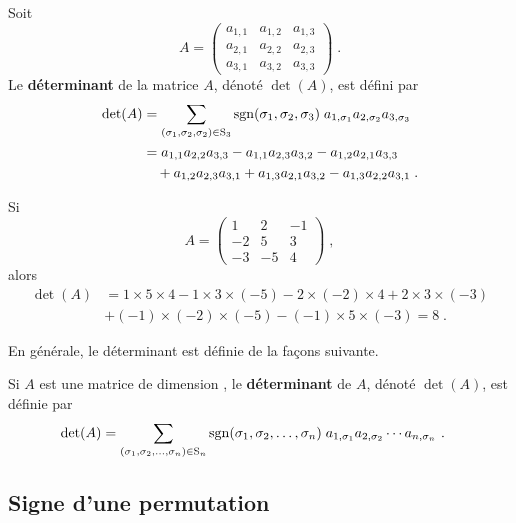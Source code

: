 {\begin{defn} 
Soit
\[
A = \begin{pmatrix} a_{1,1} & a_{1,2} & a_{1,3} \\
a_{2,1} & a_{2,2} & a_{2,3} \\
a_{3,1} & a_{3,2} & a_{3,3}
\end{pmatrix} \; .
\]
Le {\bfseries déterminant} de la matrice $A$, dénoté $\det(A)$, est
défini par
\begin{align*}
\det(A) &= \sum_{(\sigma_1,\sigma_2,\sigma_2)\in \mathrm{S}_{3}} \operatorname{sgn}
(\sigma_1,\sigma_2,\sigma_3)\; a_{1,\sigma_1} a_{2,\sigma_2} a_{3,\sigma_3} \\
&= a_{1,1}a_{2,2}a_{3,3} - a_{1,1}a_{2,3}a_{3,2}
- a_{1,2}a_{2,1}a_{3,3} \\
&\quad + a_{1,2}a_{2,3}a_{3,1}
+ a_{1,3}a_{2,1}a_{3,2} - a_{1,3}a_{2,2}a_{3,1} \; .
\end{align*}
\end{defn}

\begin{egg}
Si
\[
A= \begin{pmatrix} 1 & 2 & -1 \\ -2 & 5 & 3 \\
-3 & -5 & 4 \end{pmatrix} \; ,
\]
alors
\begin{align*}
\det(A) &= 1\times 5 \times 4 - 1\times 3 \times (-5)
- 2 \times (-2)\times 4 + 2 \times 3 \times (-3) \\
& +(-1)\times (-2)\times (-5) - (-1)\times 5 \times (-3)
= 8 \; .
\end{align*}
\end{egg}

En générale, le déterminant est définie de la façons suivante.

\begin{defn} 
Si $A$ est une matrice de dimension \nn, le {\bfseries déterminant} de
$A$, dénoté $\det(A)$, est définie par
\begin{align*}
\det(A) &= \sum_{(\sigma_1,\sigma_2,\ldots,\sigma_n)\in \mathrm{S}_{n}} \operatorname{sgn}
(\sigma_1,\sigma_2,\ldots,\sigma_n)\;
a_{1,\sigma_1} a_{2,\sigma_2}\cdots  a_{n,\sigma_n} \ .
\end{align*}
\label{gendeffdet}
\end{defn}

\subsection{Signe d'une permutation \theory}

}
